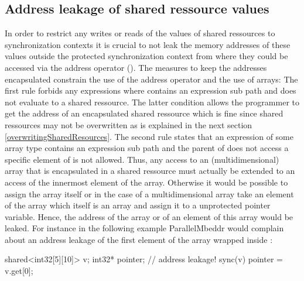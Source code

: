 \subsection{Address leakage of shared ressource values}
In order to restrict any writes or reads of the values of shared ressources to synchronization contexts it is crucial to not leak the memory addresses of these values outside the protected synchronization context from where they could be accessed via the address operator (\CODE{\&}). The measures to keep the addresses encapsulated constrain the use of the address operator and the use of arrays: The first rule forbids any expressions  where  contains an expression sub path  and  does not evaluate to a shared ressource. The latter condition allows the programmer to get the address of an encapsulated shared ressource which is fine since shared ressources may not be overwritten as is explained in the next section \ref{overwritingSharedResources}. The second rule states that an expression  of some array type contains an expression sub path  and the parent of  does not access a specific element of  is not allowed. Thus, any access to an (multidimensional) array that is encapsulated in a shared ressource must actually be extended to an access of the innermost element of the array. Otherwise it would be possible to assign the array itself or in the case of a multidimensional array take an element of the array which itself is an array and assign it to a unprotected pointer variable. Hence, the address of the array or of an element of this array would be leaked. For instance in the following example ParallelMbeddr would complain about an address leakage of the first element of the array wrapped inside :
\begin{ccode}
shared<int32[5][10]> v;
int32* pointer;
// address leakage!
sync(v) { pointer = v.get[0]; }
\end{ccode}

